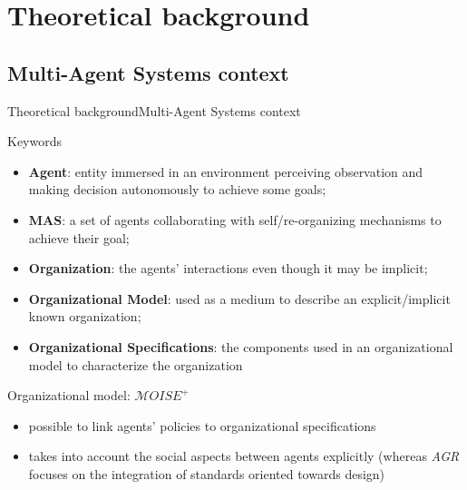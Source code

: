 \AtBeginSection[]{
    \begin{frame}
        \frametitle{}
        \tableofcontents[currentsection]
    \end{frame}
}


\section{Theoretical background}

\subsection{Multi-Agent Systems context}

\begin{frame}[allowframebreaks]{Theoretical background}{Multi-Agent Systems context}

    \begin{block}{Keywords}
        \begin{itemize}
            \item \textbf{Agent}: entity immersed in an environment perceiving observation and making decision autonomously to achieve some goals;
            \item \textbf{MAS}: a set of agents collaborating with self/re-organizing mechanisms to achieve their goal;
            \item \textbf{Organization}: the agents' interactions even though it may be implicit;
            \item \textbf{Organizational Model}: used as a medium to describe an explicit/implicit known organization;
            \item \textbf{Organizational Specifications}: the components used in an organizational model to characterize the organization
        \end{itemize}
    \end{block}

    \begin{block}{Organizational model: $\mathcal{M}OISE^+$}
        \begin{itemize}
            \item possible to link agents' policies to organizational specifications
            \item takes into account the social aspects between agents explicitly (whereas \emph{AGR} focuses on the integration of standards oriented towards design)
        \end{itemize}
    \end{block}

    

\end{frame}


